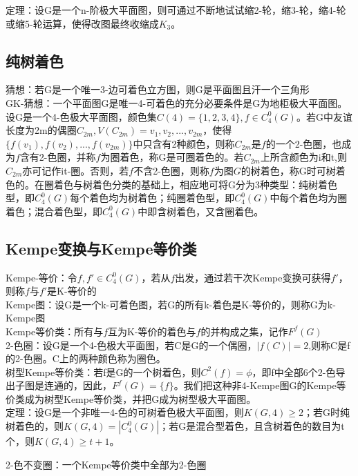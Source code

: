 \documentclass[12pt, UTF8]{ctexart}
\begin{document}
定理：设G是一个n-阶极大平面图，则可通过不断地试试缩2-轮，缩3-轮，缩4-轮或缩5-轮运算，使得改图最终收缩成$K_3$。

\subsection{纯树着色}
猜想：若G是一个唯一3-边可着色立方图，则G是平面图且汗一个三角形\\
GK-猜想：一个平面图G是唯一4-可着色的充分必要条件是G为地柜极大平面图。\\
设G是一个4-色极大平面图，颜色集$C(4)=\{1,2,3,4\}, f \in C_4^0(G)$。若G中友谊长度为2m的偶圈$C_{2m}, V(C_{2m})={v_1,v_2,...,v_{2m}}$，使得$\{f(v_1), f(v_2),...,f(v_{2m})\}$中只含有2种颜色，则称$C_{2m}$是$f$的一个2-色圈，也成为$f$含有2-色圈，并称$f$为圈着色，称G是可圈着色的。若$C_{2m}$上所含颜色为i和t,则$C_{2m}$亦可记作it-圈。否则，若$f$不含2-色圈，则称$f$为图$G$的树着色，称G时可树着色的。在圈着色与树着色分类的基础上，相应地可将G分为3种类型：纯树着色型，即$C_4^0(G)$每个着色均为树着色；纯圈着色型，即$C_4^0(G)$中每个着色均为圈着色；混合着色型，即$C_4^0(G)$中即含树着色，又含圈着色。


\subsection{Kempe变换与Kempe等价类}
Kempe-等价：令$f,f' \in C_4^0(G)$，若从$f$出发，通过若干次Kempe变换可获得$f'$，则称$f$与$f'$是K-等价的\\
Kempe图：设G是一个k-可着色图，若G的所有k-着色是K-等价的，则称G为k-Kempe图\\
Kempe等价类：所有与$f$互为K-等价的着色与$f$的并构成之集，记作$F^f(G)$\\
2-色圈：设G是一个4-色极大平面图，若C是G的一个偶圈，$|f(C)|=2$,则称C是f的2-色圈。C上的两种颜色称为圈色。\\

树型Kempe等价类：若f是G的一个树着色，则$C^2(f)=\phi$，即f中全部6个2-色导出子图是连通的，因此，$F^f(G)=\{f\}$。我们把这种非4-Kempe图G的Kempe等价类成为树型Kempe等价类，并把G成为树型极大平面图。\\
定理：设G是一个非唯一4-色的可树着色极大平面图，则$K(G,4) \ge 2$；若G时纯树着色的，则$K(G,4)=|C^0_4(G)|$；若G是混合型着色，且含树着色的数目为t个，则$K(G,4) \ge t+1$。

2-色不变圈：一个Kempe等价类中全部为2-色圈\\
\end{document}
